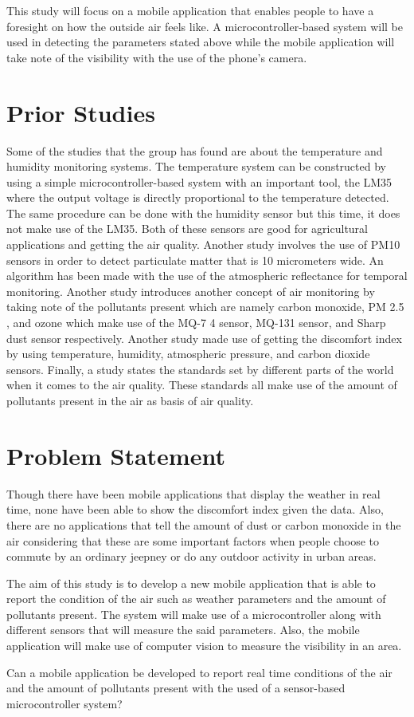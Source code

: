 \par \noindent
This study will focus on a mobile application that enables people to have a foresight on how the outside air feels like. A microcontroller-based system will be used in detecting the parameters stated above while the mobile application will take note of the visibility with the use of the phone's camera.

\section{Prior Studies}

Some of the studies that the group has found are about the temperature and humidity monitoring systems. The temperature system can be constructed by using a simple microcontroller-based system with an important tool, the LM35 where the output voltage is directly proportional to the temperature detected. The same procedure can be done with the humidity sensor but this time, it does not make use of the LM35. Both of these sensors are good for agricultural applications and getting the air quality. Another study involves the use of PM10 sensors in order to detect particulate matter that is 10 micrometers wide. An algorithm has been made with the use of the atmospheric reflectance for temporal monitoring. Another study introduces another concept of air monitoring by taking note of the pollutants present which are namely carbon monoxide, PM 2.5 , and ozone which make use of the MQ-7 4
sensor, MQ-131 sensor, and Sharp dust sensor respectively. Another study made use of getting the discomfort index by using temperature, humidity, atmospheric pressure, and carbon dioxide sensors. Finally, a study states the standards set by different parts of the world when it comes to the air quality. These standards all make use of the amount of pollutants present in the air as basis of air quality.



\section{Problem Statement}

Though there have been mobile applications that display the weather in real time, none have been able to show the discomfort index given the data. Also, there are no applications that tell the amount of dust or carbon monoxide in the air considering that these are some important factors when people choose to commute by an ordinary jeepney or do any outdoor activity in urban areas.
\par \noindent
The aim of this study is to develop a new mobile application that is able to report the condition of the air such as weather parameters and the amount of pollutants present. The system will make use of a microcontroller along with different sensors that will measure the said parameters. Also, the mobile application will make use of computer vision to measure the visibility in an area.
\par \noindent
Can a mobile application be developed to report real time conditions of the air and the amount of pollutants present with the used of a sensor-based microcontroller system?

